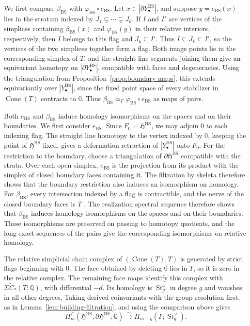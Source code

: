 \documentclass[12 pt]{amsart}
\newcommand{\fH}{\mathfrak H}
\newcommand{\QQ}{\mathbb{Q}}
\newcommand{\BS}{\mathrm{BS}}
\newcommand{\St}{\operatorname{St}}
\newcommand{\Cone}{\operatorname{Cone}}
\newcommand{\<}{\langle}
\renewcommand{\>}{\rangle}
\theoremstyle{definition}
\begin{document}
We first compare $\beta_{\BS}$ with $\varphi_{\BS} \circ e_{\BS}$. Let $x \in |\partial Y_\bullet^{\BS}|$, and suppose $y = e_{\BS}(x)$ lies in the stratum indexed by $J_1 \subsetneq \cdots \subsetneq J_k$. If $I$ and $I'$ are vertices of the simplices containing $\beta_{\BS}(x)$ and $\varphi_{\BS}(y)$ in their relative interiors, respectively, then $I$ belongs to this flag and $J_k \subseteq I'$. Thus $I \subseteq J_k \subseteq I'$, so the vertices of the two simplices together form a flag. Both image points lie in the corresponding simplex of $T$, and the straight line segments joining them give an equivariant homotopy on $|\partial Y_\bullet^{\BS}|$, compatible with faces and degeneracies. Using the triangulation from Proposition~\ref{prop:boundary-maps}, this extends equivariantly over $|Y_\bullet^{\BS}|$, since the fixed point space of every stabilizer in $\Cone(T)$ contracts to $0$. Thus $\beta_{\BS} \simeq_\Gamma \varphi_{\BS} \circ e_{\BS}$ as maps of pairs.

Both $e_{\BS}$ and $\beta_{\BS}$ induce homology isomorphisms on the spaces and on their boundaries. We first consider $e_{\BS}$. Since $F_0 = \fH^{\BS}$, we may adjoin $0$ to each indexing flag. The straight line homotopy to the vertex indexed by $0$, keeping the point of $\fH^{\BS}$ fixed, gives a deformation retraction of $|Y_\bullet^{\BS}|$ onto $F_0$. For the restriction to the boundary, choose a triangulation of $\partial \fH^{\BS}$ compatible with the strata. Over each open simplex, $e_{\BS}$ is the projection from its product with the simplex of closed boundary faces containing it. The filtration by skeleta therefore shows that the boundary restriction also induces an isomorphism on homology. For $\beta_{\BS}$, every intersection indexed by a flag is contractible, and the nerve of the closed boundary faces is $T$ \cite[\S\S8.3--8.4]{BorelSerre}. The realization spectral sequence therefore shows that $\beta_{\BS}$ induces homology isomorphisms on the spaces and on their boundaries. These isomorphisms are preserved on passing to homotopy quotients, and the long exact sequences of the pairs give the corresponding isomorphisms on relative homology.

The relative simplicial chain complex of $(\Cone(T), T)$ is generated by strict flags beginning with $0$. The face obtained by deleting $0$ lies in $T$, so it is zero in the relative complex. The remaining face maps identify this complex with $\Sigma \widetilde C_*(T; \QQ)$, with differential $-d$. Its homology is $\St_g^\omega$ in degree $g$ and vanishes in all other degrees. Taking derived coinvariants with the group resolution first, as in Lemma~\ref{lem:building-filtration}, and using the comparison above gives
\[
H_m^\Gamma(\fH^{\BS}, \partial \fH^{\BS}; \QQ) \xrightarrow{\sim} H_{m - g}(\Gamma; \St_g^\omega).
\]
\end{document}
